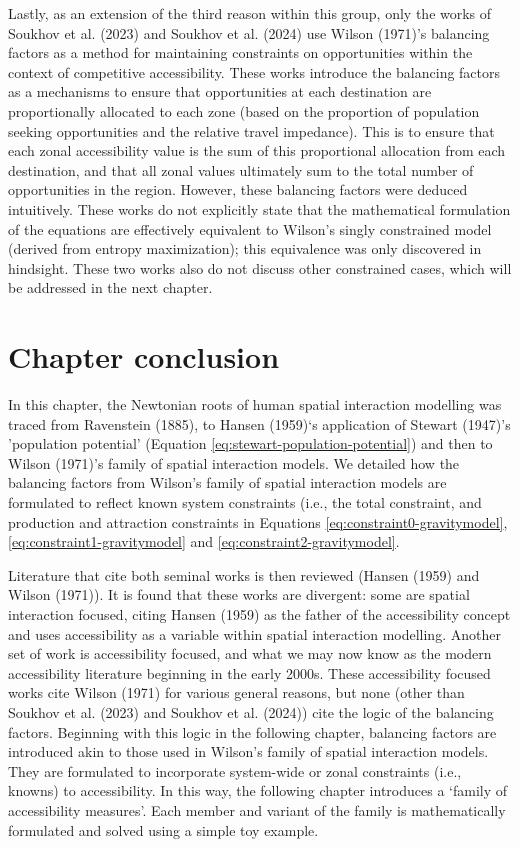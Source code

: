 \documentclass[
11pt, %
oneside, %
english, %
singlespacing, %
]{macthesis} %
\begin{document}
Lastly, as an extension of the third reason within this group, only the works of Soukhov et al. (2023) and Soukhov et al. (2024) use Wilson (1971)'s balancing factors as a method for maintaining constraints on opportunities within the context of competitive accessibility. These works introduce the balancing factors as a mechanisms to ensure that opportunities at each destination are proportionally allocated to each zone (based on the proportion of population seeking opportunities and the relative travel impedance). This is to ensure that each zonal accessibility value is the sum of this proportional allocation from each destination, and that all zonal values ultimately sum to the total number of opportunities in the region. However, these balancing factors were deduced intuitively. These works do not explicitly state that the mathematical formulation of the equations are effectively equivalent to Wilson's singly constrained model (derived from entropy maximization); this equivalence was only discovered in hindsight. These two works also do not discuss other constrained cases, which will be addressed in the next chapter.

\section{Chapter conclusion}\label{chapter-conclusion}

In this chapter, the Newtonian roots of human spatial interaction modelling was traced from Ravenstein (1885), to Hansen (1959)`s application of Stewart (1947)'s 'population potential' (Equation \ref{eq:stewart-population-potential}) and then to Wilson (1971)'s family of spatial interaction models. We detailed how the balancing factors from Wilson's family of spatial interaction models are formulated to reflect known system constraints (i.e., the total constraint, and production and attraction constraints in Equations \ref{eq:constraint0-gravitymodel}, \ref{eq:constraint1-gravitymodel} and \ref{eq:constraint2-gravitymodel}.

Literature that cite both seminal works is then reviewed (Hansen (1959) and Wilson (1971)). It is found that these works are divergent: some are spatial interaction focused, citing Hansen (1959) as the father of the accessibility concept and uses accessibility as a variable within spatial interaction modelling. Another set of work is accessibility focused, and what we may now know as the modern accessibility literature beginning in the early 2000s. These accessibility focused works cite Wilson (1971) for various general reasons, but none (other than Soukhov et al. (2023) and Soukhov et al. (2024)) cite the logic of the balancing factors. Beginning with this logic in the following chapter, balancing factors are introduced akin to those used in Wilson's family of spatial interaction models. They are formulated to incorporate system-wide or zonal constraints (i.e., knowns) to accessibility. In this way, the following chapter introduces a `family of accessibility measures'. Each member and variant of the family is mathematically formulated and solved using a simple toy example.
\end{document}
